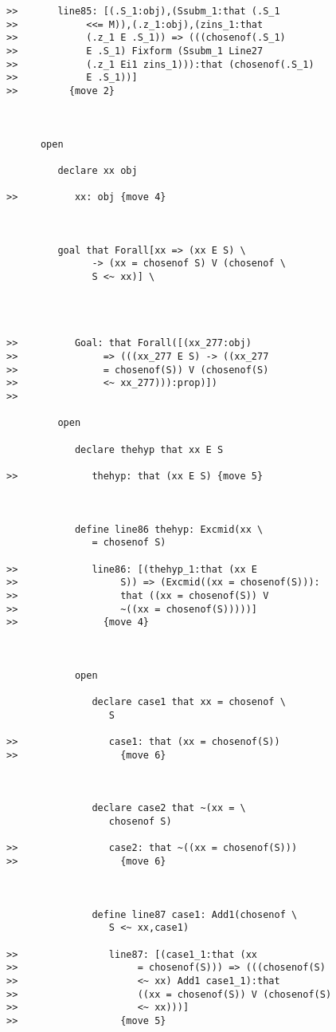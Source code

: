 \documentclass[12pt]{article}
\begin{document}
\begin{verbatim}
>>       line85: [(.S_1:obj),(Ssubm_1:that (.S_1
>>            <<= M)),(.z_1:obj),(zins_1:that
>>            (.z_1 E .S_1)) => (((chosenof(.S_1)
>>            E .S_1) Fixform (Ssubm_1 Line27
>>            (.z_1 Ei1 zins_1))):that (chosenof(.S_1)
>>            E .S_1))]
>>         {move 2}



      open

         declare xx obj

>>          xx: obj {move 4}



         goal that Forall[xx => (xx E S) \
               -> (xx = chosenof S) V (chosenof \
               S <~ xx)] \
            



>>          Goal: that Forall([(xx_277:obj)
>>               => (((xx_277 E S) -> ((xx_277
>>               = chosenof(S)) V (chosenof(S)
>>               <~ xx_277))):prop)])
>>            

         open

            declare thehyp that xx E S

>>             thehyp: that (xx E S) {move 5}



            define line86 thehyp: Excmid(xx \
               = chosenof S)

>>             line86: [(thehyp_1:that (xx E
>>                  S)) => (Excmid((xx = chosenof(S))):
>>                  that ((xx = chosenof(S)) V
>>                  ~((xx = chosenof(S)))))]
>>               {move 4}



            open

               declare case1 that xx = chosenof \
                  S

>>                case1: that (xx = chosenof(S))
>>                  {move 6}



               declare case2 that ~(xx = \
                  chosenof S)

>>                case2: that ~((xx = chosenof(S)))
>>                  {move 6}



               define line87 case1: Add1(chosenof \
                  S <~ xx,case1)

>>                line87: [(case1_1:that (xx
>>                     = chosenof(S))) => (((chosenof(S)
>>                     <~ xx) Add1 case1_1):that
>>                     ((xx = chosenof(S)) V (chosenof(S)
>>                     <~ xx)))]
>>                  {move 5}




\end{verbatim}
\end{document}
